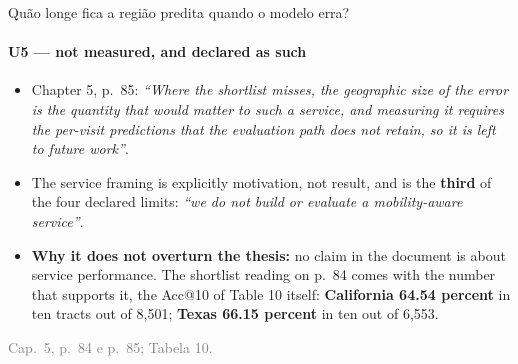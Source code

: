 \documentclass{beamer}
\begin{document}
\begin{frame}[noframenumbering]{Quão longe fica a região predita quando o modelo erra?}
    \framesubtitle{U5 --- not measured, and declared as such}
    \hypertarget{u5}{}
    \small
    \begin{itemize}\setlength{\itemsep}{0pt}\setlength{\parskip}{0pt}
        \item Chapter 5, p.~85: \textit{``Where the shortlist misses, the geographic size of the error is the quantity that would matter to such a service, and measuring it requires the per-visit predictions that the evaluation path does not retain, so it is left to future work''}.
        \item The service framing is explicitly motivation, not result, and is the \textbf{third} of the four declared limits: \textit{``we do not build or evaluate a mobility-aware service''}.
        \item \textbf{Why it does not overturn the thesis:} no claim in the document is about service performance. The shortlist reading on p.~84 comes with the number that supports it, the Acc@10 of Table 10 itself: \textbf{California 64.54 percent} in ten tracts out of 8,501; \textbf{Texas 66.15 percent} in ten out of 6,553.
    \end{itemize}
    \vfill
    {\scriptsize
    \begin{minipage}[b]{0.775\linewidth}\raggedright\textcolor{gray}{Cap.~5, p.~84 e p.~85; Tabela 10.}\end{minipage}\hfill
    \begin{minipage}[b]{0.20\linewidth}\raggedleft \hyperlink{b0}{}\end{minipage}}
\end{frame}
\end{document}
